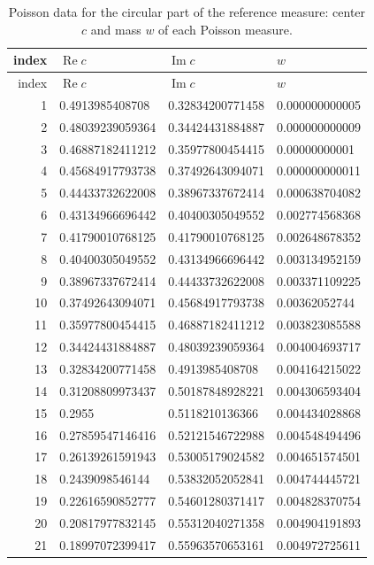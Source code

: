 \documentclass{amsart}
\numberwithin{equation}{section}
\numberwithin{table}{section}
\begin{document}
\begin{longtable}{@{}rlll@{}}
\caption{Poisson data for the circular part of the reference measure: center $c$ and mass $w$ of each Poisson measure.}\label{tab:reference-poisson}\\
\hline
index & $\operatorname{Re}c$ & $\operatorname{Im}c$ & $w$\\
\hline
\endfirsthead
\hline
index & $\operatorname{Re}c$ & $\operatorname{Im}c$ & $w$\\
\hline
\endhead
1 & 0.4913985408708 & 0.32834200771458 & 0.000000000005 \\
2 & 0.48039239059364 & 0.34424431884887 & 0.000000000009 \\
3 & 0.46887182411212 & 0.35977800454415 & 0.00000000001 \\
4 & 0.45684917793738 & 0.37492643094071 & 0.000000000011 \\
5 & 0.44433732622008 & 0.38967337672414 & 0.000638704082 \\
6 & 0.43134966696442 & 0.40400305049552 & 0.002774568368 \\
7 & 0.41790010768125 & 0.41790010768125 & 0.002648678352 \\
8 & 0.40400305049552 & 0.43134966696442 & 0.003134952159 \\
9 & 0.38967337672414 & 0.44433732622008 & 0.003371109225 \\
10 & 0.37492643094071 & 0.45684917793738 & 0.00362052744 \\
11 & 0.35977800454415 & 0.46887182411212 & 0.003823085588 \\
12 & 0.34424431884887 & 0.48039239059364 & 0.004004693717 \\
13 & 0.32834200771458 & 0.4913985408708 & 0.004164215022 \\
14 & 0.31208809973437 & 0.50187848928221 & 0.004306593404 \\
15 & 0.2955 & 0.5118210136366 & 0.004434028868 \\
16 & 0.27859547146416 & 0.52121546722988 & 0.004548494496 \\
17 & 0.26139261591943 & 0.53005179024582 & 0.004651574501 \\
18 & 0.2439098546144 & 0.53832052052841 & 0.004744445721 \\
19 & 0.22616590852777 & 0.54601280371417 & 0.004828370754 \\
20 & 0.20817977832145 & 0.55312040271358 & 0.004904191893 \\
21 & 0.18997072399417 & 0.55963570653161 & 0.004972725611 \\

\end{longtable}
\end{document}

